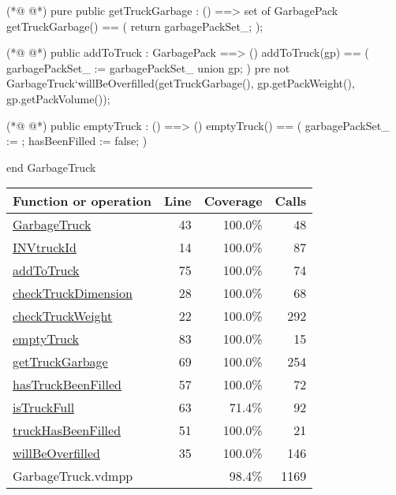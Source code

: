\begin{vdmpp}[breaklines=true]
(*@
\label{getTruckGarbage:69}
@*)
pure public getTruckGarbage : () ==> set of GarbagePack
getTruckGarbage() ==
(
    return garbagePackSet_;
);

(*@
\label{addToTruck:75}
@*)
public addToTruck : GarbagePack ==> ()
addToTruck(gp) ==
(
    garbagePackSet_ := garbagePackSet_ union {gp};
)
pre not GarbageTruck`willBeOverfilled(getTruckGarbage(), gp.getPackWeight(), gp.getPackVolume());


(*@
\label{emptyTruck:83}
@*)
public emptyTruck : () ==> ()
emptyTruck() == 
(
    garbagePackSet_ := {};
    hasBeenFilled := false;
)

end GarbageTruck
\end{vdmpp}
\bigskip
\begin{longtable}{|l|r|r|r|}
\hline
Function or operation & Line & Coverage & Calls \\
\hline
\hline
\hyperref[GarbageTruck:43]{GarbageTruck} & 43&100.0\% & 48 \\
\hline
\hyperref[INVtruckId:14]{INVtruckId} & 14&100.0\% & 87 \\
\hline
\hyperref[addToTruck:75]{addToTruck} & 75&100.0\% & 74 \\
\hline
\hyperref[checkTruckDimension:28]{checkTruckDimension} & 28&100.0\% & 68 \\
\hline
\hyperref[checkTruckWeight:22]{checkTruckWeight} & 22&100.0\% & 292 \\
\hline
\hyperref[emptyTruck:83]{emptyTruck} & 83&100.0\% & 15 \\
\hline
\hyperref[getTruckGarbage:69]{getTruckGarbage} & 69&100.0\% & 254 \\
\hline
\hyperref[hasTruckBeenFilled:57]{hasTruckBeenFilled} & 57&100.0\% & 72 \\
\hline
\hyperref[isTruckFull:63]{isTruckFull} & 63&71.4\% & 92 \\
\hline
\hyperref[truckHasBeenFilled:51]{truckHasBeenFilled} & 51&100.0\% & 21 \\
\hline
\hyperref[willBeOverfilled:35]{willBeOverfilled} & 35&100.0\% & 146 \\
\hline
\hline
GarbageTruck.vdmpp & & 98.4\% & 1169 \\
\hline
\end{longtable}

